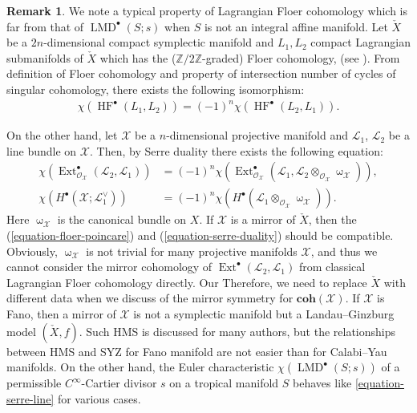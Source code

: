 \documentclass[a4paper,dvipdfmx,reqno,12pt]{amsart}
\theoremstyle{definition}
\newtheorem{remark}[theorem]{Remark}
\newcommand{\mcal}[1]{\mathcal{#1}}%
\newcommand{\opn}[1]{\operatorname{#1}}
\newcommand{\catn}[1]{\mathbf{#1}}
\numberwithin{equation}{section}
\begin{document}
\begin{remark}
\label{remark-calabi-yau-condition}
We note a typical property of Lagrangian 
Floer cohomology which is far from that of 
$\opn{LMD}^{\bullet}(S;s)$ when $S$ is not 
an integral affine manifold.
Let $\check{X}$ be a $2n$-dimensional 
compact symplectic manifold and 
$L_1,L_2$
compact Lagrangian submanifolds of $\check{X}$ 
which has the ($\mathbb{Z}/2\mathbb{Z}$-graded)
Floer cohomology, (see 
\cite[Theorem 1.5]{}).
From definition of  
Floer cohomology and 
property of intersection number of cycles of singular 
cohomology, there exists the
following isomorphism:
\begin{align}
\label{equation-floer-poincare}
\chi (\opn{HF}^{\bullet}(L_1,L_2))
=(-1)^{n} 
\chi(\opn{HF}^{\bullet}(L_2,L_1)).
\end{align}

On the other hand, let $\mathcal{X}$ be a 
$n$-dimensional
projective manifold and $\mathcal{L}_1$, $\mathcal{L}_2$ be a
line bundle on $\mathcal{X}$. 
Then, by Serre duality there exists 
the following equation:
\begin{align}
\label{equation-serre-duality}
\chi(\opn{Ext}^{\bullet}_{\mcal{O}_{\mathcal{X}}}
(\mcal{L}_2,\mcal{L}_1))
&= (-1)^{n}\chi(\opn{Ext}^{\bullet}_{\mcal{O}_{\mathcal{X}}}
(\mcal{L}_1,\mcal{L}_2\otimes_{\mathcal{O}_{\mathcal{X}}} 
\upomega_{\mathcal{X}})), \\
\label{equation-serre-line}
\chi(H^{\bullet}(\mathcal{X};\mathcal{L}_1^{\vee}))
&= (-1)^{n}\chi(H^{\bullet}(\mathcal{L}_1
\otimes_{\mathcal{O}_{\mathcal{X}}}\upomega_{\mathcal{X}})).
\end{align}
Here $\upomega_{\mathcal{X}}$ is the canonical bundle on $X$.
If $\mathcal{X}$ is a mirror of $\check{X}$, then 
the (\ref{equation-floer-poincare}) and 
(\ref{equation-serre-duality}) should be compatible.
Obviously, 
$\upomega_{\mathcal{X}}$ is not trivial for many 
projective manifolds $\mathcal{X}$,
and thus we cannot consider the mirror cohomology of 
$\opn{Ext}^{\bullet}(\mathcal{L}_2,\mathcal{L}_1)$
from classical Lagrangian Floer cohomology directly.
Our
Therefore, we need to replace $\check{X}$ 
with different data when we discuss of the mirror 
symmetry for $\catn{coh}(\mathcal{X})$. 
If $\mathcal{X}$ is Fano, then a
mirror of $\mathcal{X}$ is not a symplectic 
manifold but a Landau--Ginzburg model
$(\check{X},f)$.
Such HMS is discussed for many authors, 
but the relationships between HMS and SYZ
for Fano manifold
are not easier than 
for Calabi--Yau manifolds.
On the other hand, the Euler characteristic 
$\chi(\opn{LMD}^{\bullet}(S;s))$ of 
a permissible $C^{\infty}$-Cartier divisor
$s$ on a tropical manifold $S$ behaves 
like \cref{equation-serre-line} for various 
cases.

\end{remark}
\end{document}
